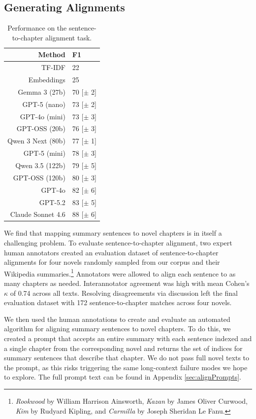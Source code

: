 \documentclass{article} %
\begin{document}
\subsection{Generating Alignments}
\label{subsec:validation}

\begin{table}
  \small
  \centering
  \begin{tabular}{rl}
    \textbf{Method} & \textbf{F1} \\
    \midrule
    TF-IDF & 22 \\
    Embeddings & 25 \\
    \midrule
    Gemma 3 (27b) & 70 [$\pm$ 2] \\
    GPT-5 (nano) & 73 [$\pm$ 2] \\
    GPT-4o (mini) & 73 [$\pm$ 3] \\
    GPT-OSS (20b) & 76 [$\pm$ 3] \\
    Qwen 3 Next (80b) & 77 [$\pm$ 1] \\
    GPT-5 (mini) & 78 [$\pm$ 3] \\
    Qwen 3.5 (122b) & 79 [$\pm$ 5] \\
    GPT-OSS (120b) & 80 [$\pm$ 3] \\
    GPT-4o & 82 [$\pm$ 6] \\
    GPT-5.2 & 83 [$\pm$ 5] \\
    Claude Sonnet 4.6 & 88 [$\pm$ 6] \\
    \bottomrule
  \end{tabular}
  \caption{Performance on the sentence-to-chapter alignment task.}
  \label{tab:alignResults}
\end{table}

We find that mapping summary sentences to novel chapters is in itself a challenging problem.
To evaluate sentence-to-chapter alignment, two expert human annotators created an evaluation dataset of sentence-to-chapter alignments for four novels randomly sampled from our corpus and their Wikipedia summaries.\footnote{\textit{Rookwood} by William Harrison Ainsworth, \textit{Kazan} by James Oliver Curwood, \textit{Kim} by Rudyard Kipling, and \textit{Carmilla} by Joseph Sheridan Le Fanu.}
Annotators were allowed to align each sentence to as many chapters as needed.
Interannotator agreement was high with mean Cohen's $\kappa$ of 0.74 across all texts.
Resolving disagreements via discussion left the final evaluation dataset with 172 sentence-to-chapter matches across four novels.

We then used the human annotations to create and evaluate an automated algorithm for aligning summary sentences to novel chapters.
To do this, we created a prompt that accepts an entire summary with each sentence indexed and a single chapter from the corresponding novel and returns the set of indices for summary sentences that describe that chapter.
We do not pass full novel texts to the prompt, as this risks triggering the same long-context failure modes we hope to explore.
The full prompt text can be found in Appendix \ref{sec:alignPrompts}.
\end{document}

